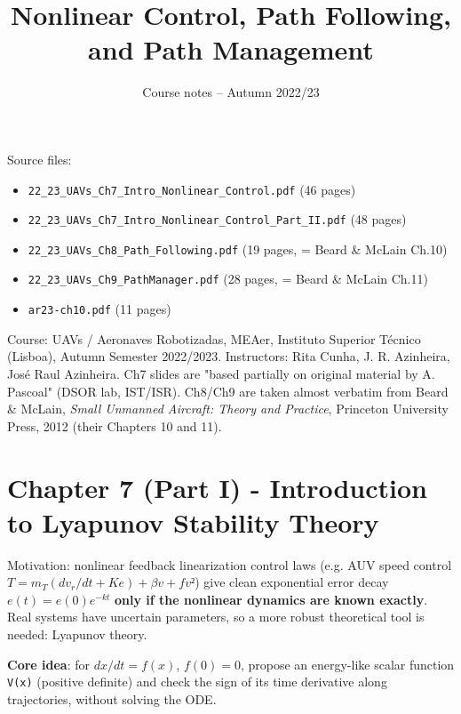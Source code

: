 \documentclass[11pt]{article}
\title{Nonlinear Control, Path Following, and Path Management}
\author{Course notes -- Autumn 2022/23}
\date{}
\begin{document}
\maketitle
\tableofcontents
\vspace{1em}

Source files:
\begin{itemize}
\item \texttt{22\_\allowbreak{}23\_\allowbreak{}UAVs\_\allowbreak{}Ch7\_\allowbreak{}Intro\_\allowbreak{}Nonlinear\_\allowbreak{}Control.pdf} (46 pages)
\item \texttt{22\_\allowbreak{}23\_\allowbreak{}UAVs\_\allowbreak{}Ch7\_\allowbreak{}Intro\_\allowbreak{}Nonlinear\_\allowbreak{}Control\_\allowbreak{}Part\_\allowbreak{}II.pdf} (48 pages)
\item \texttt{22\_\allowbreak{}23\_\allowbreak{}UAVs\_\allowbreak{}Ch8\_\allowbreak{}Path\_\allowbreak{}Following.pdf} (19 pages, = Beard \& McLain Ch.10)
\item \texttt{22\_\allowbreak{}23\_\allowbreak{}UAVs\_\allowbreak{}Ch9\_\allowbreak{}PathManager.pdf} (28 pages, = Beard \& McLain Ch.11)
\item \texttt{ar23-ch10.pdf} (11 pages)
\end{itemize}

Course: UAVs / Aeronaves Robotizadas, MEAer, Instituto Superior Técnico (Lisboa), Autumn Semester 2022/2023. Instructors: Rita Cunha, J. R. Azinheira, José Raul Azinheira. Ch7 slides are "based partially on original material by A. Pascoal" (DSOR lab, IST/ISR). Ch8/Ch9 are taken almost verbatim from Beard \& McLain, \textit{Small Unmanned Aircraft: Theory and Practice}, Princeton University Press, 2012 (their Chapters 10 and 11).

\section{Chapter 7 (Part I) - Introduction to Lyapunov Stability Theory}

Motivation: nonlinear feedback linearization control laws (e.g. AUV speed control $T = m_T(dv_r/dt + Ke) + βv + fv²$) give clean exponential error decay $e(t)=e(0)e^{-kt}$ \textbf{only if the nonlinear dynamics are known exactly}. Real systems have uncertain parameters, so a more robust theoretical tool is needed: Lyapunov theory.

\textbf{Core idea}: for $dx/dt = f(x)$, $f(0)=0$, propose an energy-like scalar function \texttt{V(x)} (positive definite) and check the sign of its time derivative along trajectories, without solving the ODE.
\end{document}
